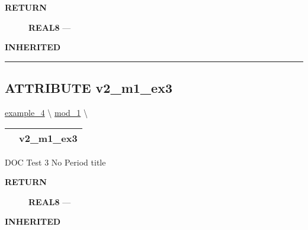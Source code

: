 \par
\begin{description}
\item [\colorbox{tagtype}{\color{white} \textbf{\textsf{RETURN}}}] \textbf{REAL8} --- 
\end{description}






\par
\begin{description}
\item [\colorbox{tagtype}{\color{white} \textbf{\textsf{INHERITED}}}] 
\end{description}



\rule{\linewidth}{0.5pt}
\subsection*{\textsf{\colorbox{headtoc}{\color{white} ATTRIBUTE}
v2\_m1\_ex3}}

\hypertarget{ecldoc:example_3.mod_1.v2_m1_ex3}{}
\hspace{0pt} \hyperlink{ecldoc:intest.example_4}{example_4} \textbackslash 
\hspace{0pt} \hyperlink{ecldoc:intest.example_4.mod_1}{mod_1} \textbackslash 

{\renewcommand{\arraystretch}{1.5}
\begin{tabularx}{\textwidth}{|>{\raggedright\arraybackslash}l|X|}
\hline
\hspace{0pt}\mytexttt{\color{red} } & \textbf{v2\_m1\_ex3} \\
\hline
\end{tabularx}
}

\par





DOC Test 3 No Period title








\par
\begin{description}
\item [\colorbox{tagtype}{\color{white} \textbf{\textsf{RETURN}}}] \textbf{REAL8} --- 
\end{description}






\par
\begin{description}
\item [\colorbox{tagtype}{\color{white} \textbf{\textsf{INHERITED}}}] 
\end{description}



